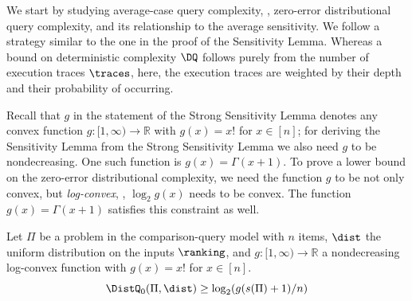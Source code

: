 We start by studying average-case query complexity, \ie, zero-error distributional query complexity, and its relationship to the average sensitivity. We follow a strategy similar to the one in the proof of the Sensitivity Lemma. Whereas a bound on deterministic complexity $\DQ$ follows purely from the number of execution traces $\traces$, here, the execution traces are weighted by their depth and their probability of occurring.

Recall that $g$ in the statement of the Strong Sensitivity Lemma denotes any convex function $g: [1,\infty) \to \mathbb{R}$ with $g(x) = x!$ for $x \in [n]$; for deriving the Sensitivity Lemma from the Strong Sensitivity Lemma we also need $g$ to be nondecreasing. One such function is $g(x) = \Gamma(x+1)$. To prove a lower bound on the zero-error distributional complexity, we need the function $g$ to be not only convex, but \emph{log-convex}, \ie, $\log_2 g(x)$ needs to be convex. The function $g(x) = \Gamma(x+1)$ satisfies this constraint as well.

\begin{proposition}
	\label{claim:sensitivity:average}
Let $\Pi$ be a problem in the comparison-query model with $n$ items, $\dist$ the uniform distribution on the inputs $\ranking$, and $g: [1,\infty) \to \mathbb{R}$ a nondecreasing log-convex function with $g(x) = x!$ for $x \in [n]$.
\[\DistQ_0(\Pi,\dist)\ge \log_2 (g(s(\Pi)+1)/n) \]
\end{proposition}

